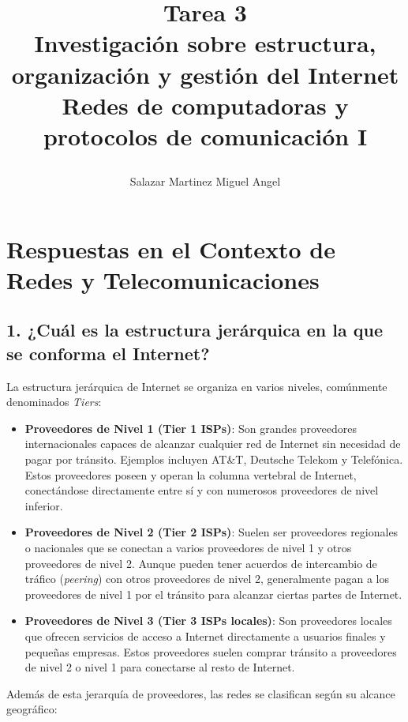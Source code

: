 \documentclass[12pt]{report}
\title{
	\begin{center}
		Tarea 3\\
		Investigación sobre estructura, organización y gestión del Internet\\
		Redes de computadoras y protocolos de comunicación I
		
	\end{center}
}
\author{Salazar Martinez Miguel Angel}
\begin{document}
	\renewcommand{\arraystretch}{1.3}
	
	\maketitle

\section*{Respuestas en el Contexto de Redes y Telecomunicaciones}

\subsection*{1. ¿Cuál es la estructura jerárquica en la que se conforma el Internet?}

La estructura jerárquica de Internet se organiza en varios niveles, comúnmente denominados \textit{Tiers}:

\begin{itemize}
	\item \textbf{Proveedores de Nivel 1 (Tier 1 ISPs)}: Son grandes proveedores internacionales capaces de alcanzar cualquier red de Internet sin necesidad de pagar por tránsito. Ejemplos incluyen AT\&T, Deutsche Telekom y Telefónica. Estos proveedores poseen y operan la columna vertebral de Internet, conectándose directamente entre sí y con numerosos proveedores de nivel inferior.
	
	\item \textbf{Proveedores de Nivel 2 (Tier 2 ISPs)}: Suelen ser proveedores regionales o nacionales que se conectan a varios proveedores de nivel 1 y otros proveedores de nivel 2. Aunque pueden tener acuerdos de intercambio de tráfico (\textit{peering}) con otros proveedores de nivel 2, generalmente pagan a los proveedores de nivel 1 por el tránsito para alcanzar ciertas partes de Internet.
	
	\item \textbf{Proveedores de Nivel 3 (Tier 3 ISPs locales)}: Son proveedores locales que ofrecen servicios de acceso a Internet directamente a usuarios finales y pequeñas empresas. Estos proveedores suelen comprar tránsito a proveedores de nivel 2 o nivel 1 para conectarse al resto de Internet.
\end{itemize}

Además de esta jerarquía de proveedores, las redes se clasifican según su alcance geográfico:
\end{document}
